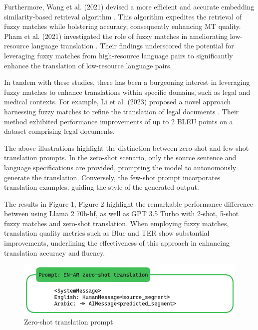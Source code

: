 \documentclass[twocolumn]{article}
\begin{document}
Furthermore, Wang et al. (2021) devised a more efficient and accurate embedding similarity-based retrieval algorithm \cite{wang2021more}. This algorithm expedites the retrieval of fuzzy matches while bolstering accuracy, consequently enhancing MT quality. Pham et al. (2021) investigated the role of fuzzy matches in ameliorating low-resource language translation \cite{pham2021fuzzy}. Their findings underscored the potential for leveraging fuzzy matches from high-resource language pairs to significantly enhance the translation of low-resource language pairs.

In tandem with these studies, there has been a burgeoning interest in leveraging fuzzy matches to enhance translations within specific domains, such as legal and medical contexts. For example, Li et al. (2023) proposed a novel approach harnessing fuzzy matches to refine the translation of legal documents \cite{li2023fuzzy}. Their method exhibited performance improvements of up to 2 BLEU points on a dataset comprising legal documents.

The above illustrations highlight the distinction between zero-shot and few-shot translation prompts. In the zero-shot scenario, only the source sentence and language specifications are provided, prompting the model to autonomously generate the translation. Conversely, the few-shot prompt incorporates translation examples, guiding the style of the generated output.

The results in Figure 1, Figure 2 highlight the remarkable performance difference between using Llama 2 70b-hf, as well as GPT 3.5 Turbo with 2-shot, 5-shot fuzzy matches and zero-shot translation. When employing fuzzy matches, translation quality metrics such as Blue and TER show substantial improvements, underlining the effectiveness of this approach in enhancing translation accuracy and fluency.

\begin{figure}
\centering
\includegraphics[width=\linewidth, ]{figs/prompt_zero_shot_translation} %
\caption{ Zero-shot translation prompt}

\label{fig:duck_863}
\end{figure}
\end{document}
